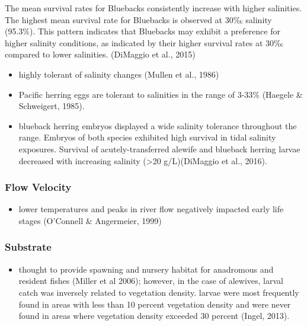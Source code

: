 \documentclass[
]{book}
\providecommand{\tightlist}{%
  \setlength{\itemsep}{0pt}\setlength{\parskip}{0pt}}
\begin{document}
The mean survival rates for Bluebacks consistently increase with higher salinities.
The highest mean survival rate for Bluebacks is observed at 30‰ salinity (95.3\%).
This pattern indicates that Bluebacks may exhibit a preference for higher salinity conditions, as indicated by their higher survival rates at 30‰ compared to lower salinities. (DiMaggio et al., 2015)

\begin{itemize}
\item
  highly tolerant of salinity changes (Mullen et al., 1986)
\item
  Pacific herring eggs are tolerant to salinities in the range of 3-33\% (Haegele \& Schweigert, 1985).
\item
  blueback herring embryos displayed a wide salinity tolerance throughout the range. Embryos of both species exhibited high survival in tidal salinity exposures. Survival of acutely-transferred alewife and blueback herring larvae decreased with increasing salinity (\textgreater20 g/L)(DiMaggio et al., 2016).
\end{itemize}

\hypertarget{flow-velocity-5}{%
\subsubsection{Flow Velocity}\label{flow-velocity-5}}

\begin{itemize}
\tightlist
\item
  lower temperatures and peaks in river flow negatively impacted early life stages (O'Connell \& Angermeier, 1999)
\end{itemize}

\hypertarget{substrate-5}{%
\subsubsection{Substrate}\label{substrate-5}}

\begin{itemize}
\tightlist
\item
  thought to provide spawning and nursery habitat for anadromous and resident fishes (Miller et al 2006); however, in the case of alewives, larval catch was inversely related to vegetation density. larvae were most frequently found in areas with less than 10 percent vegetation density and were never found in areas where vegetation density exceeded 30 percent (Ingel, 2013).
\end{itemize}
\end{document}
